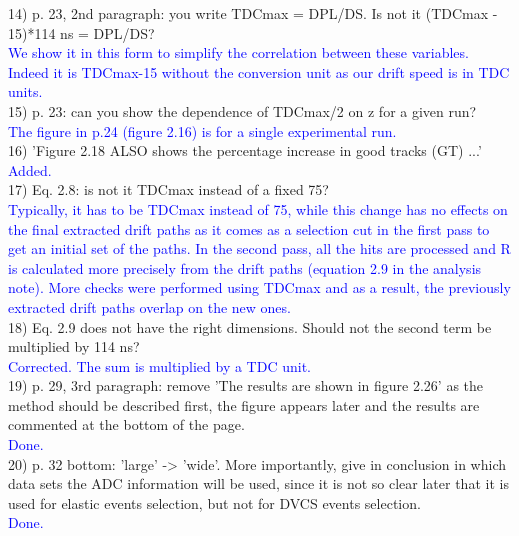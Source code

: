 14) p. 23, 2nd paragraph: you write TDCmax = DPL/DS. Is not it 
(TDCmax - 15)*114 ns = DPL/DS?\\
\textcolor{blue}{ We show it in this form to simplify the correlation between 
these variables.  Indeed it is  TDCmax-15 without the conversion unit as our 
drift speed is in TDC units. } \\

15) p. 23: can you show the dependence of TDCmax/2 on z for a given run? \\ 
\textcolor{blue}{ The figure in p.24 (figure 2.16) is for a single 
experimental run.} \\

16) 'Figure 2.18 ALSO shows the percentage increase in good 
tracks (GT) ...' \\
\textcolor{blue}{ Added.}\\

17) Eq. 2.8: is not it TDCmax instead of a fixed 75?\\
\textcolor{blue}{Typically, it has to be TDCmax instead of 75, while this 
   change has no effects on the final extracted drift paths as it comes as a 
selection cut in the first pass to get an initial set of the paths. In the 
second pass, all the hits are processed and R is calculated more precisely from 
the drift paths (equation 2.9 in the analysis note). More checks were performed 
using TDCmax and as a result, the previously extracted drift paths overlap on 
the new ones.}\\

18) Eq. 2.9 does not have the right dimensions. Should not the second term be 
multiplied by 114 ns? \\
\textcolor{blue}{ Corrected. The sum is multiplied by a TDC unit.}\\

19) p. 29, 3rd paragraph: remove 'The results are shown in figure 2.26' as the 
method should be described first, the figure appears later and the results are 
commented at the bottom of the page. \\
\textcolor{blue}{  Done.}\\

20) p. 32 bottom: 'large' -> 'wide'. More importantly, give in conclusion in which 
data sets the ADC information will be used, since it is not so clear later that 
it is used for elastic events selection, but not for DVCS events selection. \\
\textcolor{blue}{  Done.}\\

